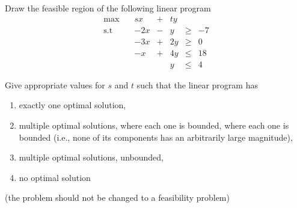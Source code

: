 \documentclass{article}
\begin{document}
\newpage

\begin{exercise}
    Draw the feasible region of the following linear program
    \begin{align}
        \max \quad & sx & +& ty\\
        \text{s.t}& -2x&-& y &\geq & -7\\
        &-3x &+&2y &\geq &0\\
        &-x&+&4y&\leq &18\\
        &&&y&\leq &4
    \end{align}

Give appropriate values for $s$ and $t$ such that the linear program has \begin{enumerate}
    \item exactly one optimal solution,
    \item multiple optimal solutions, where each one is bounded, where each one is bounded (i.e., none of its components has an arbitrarily large magnitude),
    \item multiple optimal solutions, unbounded,
    \item no optimal solution
\end{enumerate}
(the problem should not be changed to a feasibility problem)
\end{exercise}
\end{document}

